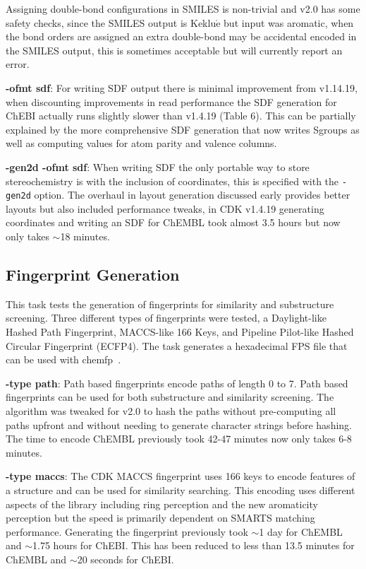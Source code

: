 \documentclass[doublespacing]{bmcart}
\def \cdkversion {v2.0}
\begin{document}
Assigning double-bond configurations in SMILES is 
non-trivial and \cdkversion{} has some safety checks, since the SMILES output is 
Keklu$\mathrm{\acute{e}}$ but input was aromatic, when the bond orders are 
assigned an extra double-bond may be accidental encoded in the SMILES output, 
this is sometimes acceptable but will currently report an error.

\textbf{-ofmt sdf}: For writing SDF output there is minimal improvement from v1.14.19, when 
discounting improvements in read performance the SDF generation for ChEBI 
actually runs slightly slower than v1.4.19 (Table 6). This can be partially 
explained by the more comprehensive SDF generation that now writes Sgroups 
as well as computing values for atom parity and valence columns.

\textbf{-gen2d -ofmt sdf}: When writing SDF the only portable way to store 
stereochemistry is with the inclusion of coordinates, this is specified with 
the \texttt{-gen2d} option. The overhaul in layout generation discussed early 
provides better layouts but also included performance tweaks, in CDK v1.4.19 
generating coordinates and writing an SDF for ChEMBL took almost 3.5 hours but
now only takes $\sim$18 minutes.

\subsection*{Fingerprint Generation}

This task tests the generation of fingerprints for similarity and substructure
screening. Three different types of fingerprints were tested, a Daylight-like 
Hashed Path Fingerprint, MACCS-like 166 Keys, and Pipeline Pilot-like Hashed 
Circular Fingerprint (ECFP4). The task generates a hexadecimal FPS file that
can be used with chemfp~\cite{Dalke2013}.

\textbf{-type path}: Path based fingerprints encode paths of length 0 to 7. Path
based fingerprints can be used for both substructure and similarity screening. 
The algorithm was tweaked for \cdkversion{} to hash the paths without 
pre-computing all paths upfront and without needing to generate character 
strings before hashing. The time to encode ChEMBL previously took 42-47 minutes 
now only takes 6-8 minutes.

\textbf{-type maccs}: The CDK MACCS fingerprint uses 166 keys to encode
features of a structure and can be used for similarity searching. This encoding
uses different aspects of the library including ring perception and the new
aromaticity perception but the speed is primarily dependent on SMARTS matching 
performance. Generating the fingerprint previously took $\sim$1 day for ChEMBL 
and $\sim$1.75 hours for ChEBI. This has been reduced to less than 
13.5 minutes for ChEMBL and $\sim$20 seconds for ChEBI. 
\end{document}
